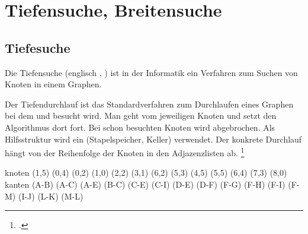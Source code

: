 \documentclass{lehramt-informatik-haupt}
\begin{document}

\chapter{Tiefensuche, Breitensuche}

\section{Tiefesuche}

\begin{quellen}
\item \cite[Seite 39-52 (PDF 32-45)]{aud:fs:6}
\item \cite{wiki:tiefensuche}
\item \cite[Kapitel 6.2.2.2 Graphalgorithmen, Seite 185]{schneider}
\end{quellen}

Die Tiefensuche (englisch , ) ist
in der Informatik ein Verfahren zum Suchen von Knoten in einem Graphen.

Der Tiefendurchlauf ist das Standardverfahren zum Durchlaufen eines
Graphen bei dem  und  besucht wird. Man geht vom jeweiligen Knoten
 und setzt den
Algorithmus dort  fort. Bei schon besuchten Knoten wird
abgebrochen. Als Hilfsstruktur wird ein  (Stapelspeicher,
Keller) verwendet. Der konkrete Durchlauf hängt von der Reihenfolge der
Knoten in den Adjazenzlisten ab.
\footcite[Seite 40 (PDF 33)]{aud:fs:6}

\def\TmpGraph{
  \graph knoten {
    \knoten{A}(1,5)
    \knoten{B}(0,4)
    \knoten{C}(0,2)
    \knoten{D}(1,0)
    \knoten{E}(2,2)
    \knoten{F}(3,1)
    \knoten{G}(6,2)
    \knoten{H}(5,3)
    \knoten{I}(4,5)
    \knoten{J}(5,5)
    \knoten{K}(6,4)
    \knoten{L}(7,3)
    \knoten{M}(8,0)
  } kanten {
    \kanteO(A-B)
    \kanteO(A-C)
    \kanteO(A-E)
    \kanteO(B-C)
    \kanteO(C-E)
    \kanteO(C-I)
    \kanteO(D-E)
    \kanteO(D-F)
    \kanteO(F-G)
    \kanteO(F-H)
    \kanteO(F-I)
    \kanteO(F-M)
    \kanteO(I-J)
    \kanteO(L-K)
    \kanteO(M-L)
  }
}

\TmpGraph

\def\TmpBesuch#1{\strut\par\textbf{Besuchte Knoten:} #1}
\def\TmpStack#1{\par\textbf{Stack:} #1}
\end{document}
